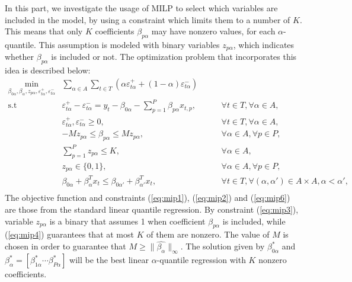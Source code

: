 In this part, we investigate the usage of MILP to select which variables are included in the model, by using a constraint which limits them to a number of $K$. This means that only $K$ coefficients $\beta_{p\alpha}$ may have nonzero values, for each $\alpha$-quantile. 
This assumption is modeled with binary variables $z_{p\alpha}$, which indicates whether $\beta_{p\alpha}$ is included or not.
The optimization problem that incorporates this idea is described below:
\begin{eqnarray}
 \underset{\beta_{0\alpha},\beta_\alpha,z_{p \alpha}, \varepsilon_{t \alpha}^{+},\varepsilon_{t \alpha}^{-}}{\text{min}} & \sum_{\alpha \in A} \sum_{t\in T}\left(\alpha\varepsilon_{t \alpha}^{+}+(1-\alpha)\varepsilon_{t\alpha}^{-}\right) \label{eq:mip0} \\
\mbox{s.t } & \varepsilon_{t \alpha}^{+}-\varepsilon_{t \alpha}^{-}=y_{t}-\beta_{0 \alpha}-\sum_{p=1}^{P}\beta_{p \alpha}x_{t,p},& \qquad\forall t \in T ,\forall \alpha \in A, \label{eq:mip1}\\
& \varepsilon_{t \alpha}^{+},\varepsilon_{t \alpha}^{-}\geq0,&\qquad\forall t \in T ,\forall \alpha \in A, \label{eq:mip2}\\
& - M z_{p \alpha} \leq \beta_{p \alpha} \leq M z_{p \alpha},&\qquad \forall \alpha \in A, \forall p\in P, \label{eq:mip3}\\
& \sum_{p=1}^P z_{p \alpha} \leq K, & \qquad \forall \alpha \in A, \label{eq:mip4}\\
& z_{p \alpha} \in \{0,1\},&\qquad \forall \alpha \in A, \forall p\in P, \label{eq:mip5}\\
& \beta_{0\alpha} + \beta_{\alpha}^T x_{t} \leq \beta_{0\alpha'} + \beta_{\alpha'}^T x_{t}, & \qquad \forall t \in T, \forall (\alpha, \alpha') \in A \times A,  \alpha < \alpha',\nonumber\\ \label{eq:mip6}
\end{eqnarray}
The objective function and constraints (\ref{eq:mip1}), (\ref{eq:mip2}) and (\ref{eq:mip6}) are those from the standard linear quantile regression. 
By constraint (\ref{eq:mip3}), variable $z_{p \alpha}$ is a binary that assumes 1 when coefficient $\beta_{p \alpha}$ is included, while (\ref{eq:mip4}) guarantees that at most $K$ of them are nonzero.
The value of $M$ is chosen in order to guarantee that $M \geq \|\hat{\beta_\alpha}\|_{\infty}$. The solution given by $\beta_{0\alpha}^*$ and $\beta_\alpha^* = [ \beta_{1 \alpha}^* \cdots \beta_{P\alpha}^* ]$ will be the best linear $\alpha$-quantile regression with $K$ nonzero coefficients.  

